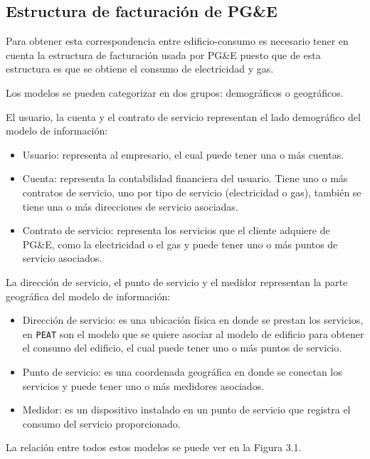 \subsection{Estructura de facturación de PG\&E}
Para obtener esta correspondencia entre edificio-consumo es necesario
tener en cuenta la estructura de facturación usada por PG\&E puesto
que de esta estructura es que se obtiene el consumo de electricidad y gas.

Los modelos se pueden categorizar en dos grupos: demográficos o geográficos.

El usuario, la cuenta y el contrato de servicio representan el lado demográfico
del modelo de información:

\begin{itemize}
\item Usuario: representa al empresario, el cual puede tener una o más cuentas.
\item Cuenta: representa la contabilidad financiera del usuario. Tiene uno o más
  contratos de servicio, uno por tipo de servicio (electricidad o gas), también
  se tiene una o más direcciones de servicio asociadas.
\item Contrato de servicio: representa los servicios que el cliente adquiere
  de PG\&E, como la electricidad o el gas y puede tener uno o más puntos
  de servicio asociados.
\end{itemize}

La dirección de servicio, el punto de servicio y el medidor representan
la parte geográfica del modelo de información:

\begin{itemize}
\item Dirección de servicio: es una ubicación física en donde se prestan los
  servicios, en \texttt{PEAT} son el modelo que se quiere asociar al modelo
  de edificio para obtener el consumo del edificio, el cual puede tener uno o más
  puntos de servicio.
\item Punto de servicio: es una coordenada geográfica en donde se conectan los
  servicios y puede tener uno o más medidores asociados.
\item Medidor: es un dispositivo instalado en un punto de servicio que registra el
  consumo del servicio proporcionado.
\end{itemize}

La relación entre todos estos modelos se puede ver en la Figura 3.1.


